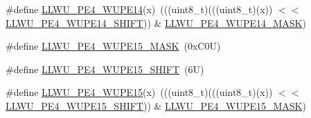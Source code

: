 \begin{DoxyCompactItemize}
\item 
\#define \mbox{\hyperlink{group___l_l_w_u___register___masks_ga376a97009729f8dde435a783deb148d8}{L\+L\+W\+U\+\_\+\+P\+E4\+\_\+\+W\+U\+P\+E14}}(x)~(((uint8\+\_\+t)(((uint8\+\_\+t)(x)) $<$$<$ \mbox{\hyperlink{group___l_l_w_u___register___masks_ga1942d07f99eb5afb836650dcfb2185af}{L\+L\+W\+U\+\_\+\+P\+E4\+\_\+\+W\+U\+P\+E14\+\_\+\+S\+H\+I\+FT}})) \& \mbox{\hyperlink{group___l_l_w_u___register___masks_gae3a1e7b7497f719cfebd559f31dc4d07}{L\+L\+W\+U\+\_\+\+P\+E4\+\_\+\+W\+U\+P\+E14\+\_\+\+M\+A\+SK}})
\item 
\#define \mbox{\hyperlink{group___l_l_w_u___register___masks_ga53e48ffd153996ab89adb3c4df7511ee}{L\+L\+W\+U\+\_\+\+P\+E4\+\_\+\+W\+U\+P\+E15\+\_\+\+M\+A\+SK}}~(0x\+C0\+U)
\item 
\#define \mbox{\hyperlink{group___l_l_w_u___register___masks_gaeaf1e05b8de75133c46d6f11b3346732}{L\+L\+W\+U\+\_\+\+P\+E4\+\_\+\+W\+U\+P\+E15\+\_\+\+S\+H\+I\+FT}}~(6\+U)
\item 
\#define \mbox{\hyperlink{group___l_l_w_u___register___masks_gadd015539f974ee2820707b9abf3787ba}{L\+L\+W\+U\+\_\+\+P\+E4\+\_\+\+W\+U\+P\+E15}}(x)~(((uint8\+\_\+t)(((uint8\+\_\+t)(x)) $<$$<$ \mbox{\hyperlink{group___l_l_w_u___register___masks_gaeaf1e05b8de75133c46d6f11b3346732}{L\+L\+W\+U\+\_\+\+P\+E4\+\_\+\+W\+U\+P\+E15\+\_\+\+S\+H\+I\+FT}})) \& \mbox{\hyperlink{group___l_l_w_u___register___masks_ga53e48ffd153996ab89adb3c4df7511ee}{L\+L\+W\+U\+\_\+\+P\+E4\+\_\+\+W\+U\+P\+E15\+\_\+\+M\+A\+SK}})
\end{DoxyCompactItemize}
